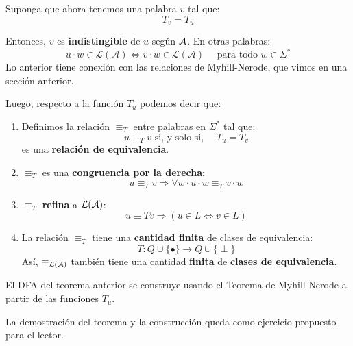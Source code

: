 \begin{multicols}{2}
Suponga que ahora tenemos una palabra $v$ tal que:
$$
    T_v = T_u
$$

Entonces, $v$ es \textbf{indistingible} de $u$ según $\mathcal{A}$. En otras palabras:
$$
    u \cdot w \in \mathcal{L}(\mathcal{A}) \Leftrightarrow v \cdot w \in \mathcal{L}(\mathcal{A}) \quad \text { para todo } w \in \Sigma^*
$$
Lo anterior tiene conexión con las relaciones de Myhill-Nerode, que vimos en una sección anterior.
\end{multicols}
Luego, respecto a la función $T_u$ podemos decir que:
\begin{enumerate}
    \item Definimos la relación $\equiv_T$ entre palabras en $\Sigma^*$ tal que:
    $$
    u \equiv_T v \text { si, y solo si, } \quad T_u=T_v
    $$
    es una \textbf{relación de equivalencia}.
    \item $\equiv_T$ es una \textbf{congruencia por la derecha}:
    $$
    u \equiv_T v \Rightarrow \forall w \cdot u \cdot w \equiv_T v \cdot w
    $$
    \item $\equiv_T$ \textbf{refina} a $\mathcal{L}(\mathcal{A})$:
    $$
    u \equiv T v \Rightarrow(u \in L \Leftrightarrow v \in L)
    $$
    \item La relación $\equiv_T$ tiene una \textbf{cantidad finita} de clases de equivalencia:
    $$
    T: Q \cup\{\bullet\} \rightarrow Q \cup\{\perp\}
    $$
    Así, $\equiv_{\mathcal{L}(\mathcal{A})}$ también tiene una cantidad \textbf{finita} de \textbf{clases de equivalencia}.
\end{enumerate}


El DFA del teorema anterior se construye usando el Teorema de Myhill-Nerode a partir de las funciones $T_u$. \medbreak

La demostración del teorema y la construcción queda como ejercicio propuesto para el lector.